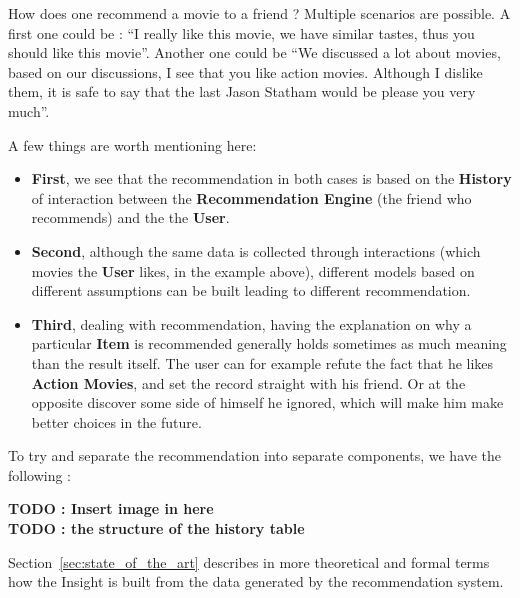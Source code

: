 \documentclass{article}
\begin{document}
How does one recommend a movie to a friend ? Multiple scenarios are possible. A first one could be : ``I really like this movie, we have similar tastes, thus you should like this movie''.
Another one could be  ``We discussed a lot about movies, based on our discussions, I see that you like action movies. Although I dislike them, it is safe to say that the last Jason Statham would be please you very much''.

A few things are worth mentioning here:

\begin{itemize}

\item \textbf{First}, we see that the recommendation in both cases is based on the \textbf{History} of interaction between the \textbf{Recommendation Engine} (the friend who recommends) and the the \textbf{User}.


\item \textbf{Second}, although the same data is collected through interactions (which movies the \textbf{User} likes, in the example above), different models based on different assumptions can be built leading to different recommendation.


\item \textbf{Third}, dealing with recommendation, having the explanation on why a particular \textbf{Item} is recommended generally holds sometimes as much meaning than the result itself.
The user can for example refute the fact that he likes \textbf{Action Movies}, and set the record straight with his friend. Or at the opposite discover some side of himself he ignored, which will make him make better choices in the future.

\end{itemize}


To try and separate the recommendation into separate components, we have the following :


\textbf{TODO : Insert image in here} \\

\textbf{TODO : the structure of the history table}

Section~\ref{sec:state_of_the_art} describes in more theoretical and formal terms how the Insight is built from the data generated by the recommendation system.

\end{document}
